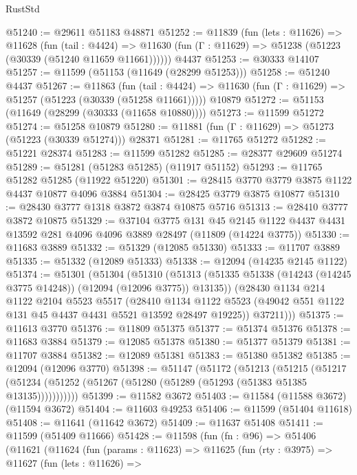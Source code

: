\begin{lexlean}{RustStd}
\begin{coremodule}
@51240 := @29611 @51183 @48871
@51252 := @11839
    (fun (lets : @11626) =>
    @11628
      (fun (tail : @4424) =>
      @11630 (fun (Γ : @11629) => @51238 (@51223 (@30339 (@51240 @11659 @11661))))))
    @4437
@51253 := @30333 @14107
@51257 := @11599 (@51153 (@11649 (@28299 @51253)))
@51258 := @51240 @4437
@51267 := @11863
    (fun (tail : @4424) => @11630 (fun (Γ : @11629) => @51257 (@51223 (@30339 (@51258 @11661)))))
    @10879
@51272 := @51153 (@11649 (@28299 (@30333 (@11658 @10880))))
@51273 := @11599 @51272
@51274 := @51258 @10879
@51280 := @11881 (fun (Γ : @11629) => @51273 (@51223 (@30339 @51274))) @28371
@51281 := @11765 @51272
@51282 := @51221 @28374
@51283 := @11599 @51282
@51285 := @28377 @29609 @51274
@51289 := @51281 (@51283 @51285) (@11917 @51152)
@51293 := @11765 @51282 @51285 (@11922 @51220)
@51301 := @28415 @3770 @3779 @3875 @1122 @4437 @10877 @4096 @3884
@51304 := @28425 @3779 @3875 @10877
@51310 := @28430 @3777 @1318 @3872 @3874 @10875 @5716
@51313 := @28410 @3777 @3872 @10875
@51329 := @37104
    @3775
    @131
    @45
    @2145
    @1122
    @4437
    @4431
    @13592
    @281
    @4096
    @4096
    @3889
    @28497
    (@11809 (@14224 @3775))
@51330 := @11683 @3889
@51332 := @51329 (@12085 @51330)
@51333 := @11707 @3889
@51335 := @51332 (@12089 @51333)
@51338 := @12094 (@14235 @2145 @1122)
@51374 := @51301
    (@51304
      (@51310
        (@51313 (@51335 @51338 (@14243 (@14245 @3775 @14248)) (@12094 (@12096 @3775)) @13135))
        (@28430
          @1134
          @214
          @1122
          @2104
          @5523
          @5517
          (@28410
            @1134
            @1122
            @5523
            (@49042 @551 @1122 @131 @45 @4437 @4431 @5521 @13592 @28497 @19225))
          @37211)))
@51375 := @11613 @3770
@51376 := @11809 @51375
@51377 := @51374 @51376
@51378 := @11683 @3884
@51379 := @12085 @51378
@51380 := @51377 @51379
@51381 := @11707 @3884
@51382 := @12089 @51381
@51383 := @51380 @51382
@51385 := @12094 (@12096 @3770)
@51398 := @51147
    (@51172
      (@51213
        (@51215
          (@51217 (@51234 (@51252 (@51267 (@51280 (@51289 (@51293 (@51383 @51385 @13135)))))))))))
@51399 := @11582 @3672
@51403 := @11584 (@11588 @3672) (@11594 @3672)
@51404 := @11603 @49253
@51406 := @11599 (@51404 @11618)
@51408 := @11641 (@11642 @3672)
@51409 := @11637 @51408
@51411 := @11599 (@51409 @11666)
@51428 := @11598
    (fun (fn : @96) =>
    @51406
      (@11621
        (@11624
          (fun (params : @11623) =>
          @11625
            (fun (rty : @3975) =>
            @11627
              (fun (lets : @11626) =>

\end{coremodule}
\end{lexlean}
